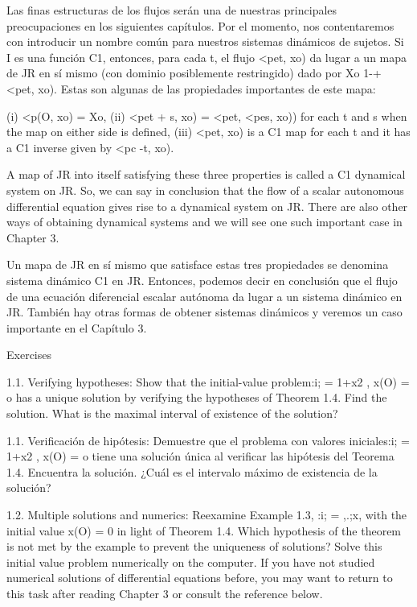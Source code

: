 \documentclass[]{article}
\begin{document}
Las finas estructuras de los flujos serán una de nuestras principales preocupaciones en los siguientes capítulos. Por el momento, nos contentaremos con introducir un nombre común para nuestros sistemas dinámicos de sujetos. Si I es una función C1, entonces, para cada t, el flujo <pet, xo) da lugar a un mapa de JR en sí mismo (con dominio posiblemente restringido) dado por Xo 1-+ <pet, xo). Estas son algunas de las propiedades importantes de este mapa:

(i) <p(O, xo) = Xo,
(ii) <pet + s, xo) = <pet, <pes, xo)) for each t and s when the map on either side is defined,
(iii) <pet, xo) is a C1 map for each t and it has a C1 inverse given by <pc -t, xo).

A map of JR into itself satisfying these three properties is called a C1 dynamical system on JR. So, we can say in conclusion that the flow of a scalar autonomous differential equation gives rise to a dynamical system on JR. There are also other ways of obtaining dynamical systems and we will see one such important case in Chapter 3.

Un mapa de JR en sí mismo que satisface estas tres propiedades se denomina sistema dinámico C1 en JR. Entonces, podemos decir en conclusión que el flujo de una ecuación diferencial escalar autónoma da lugar a un sistema dinámico en JR. También hay otras formas de obtener sistemas dinámicos y veremos un caso importante en el Capítulo 3.

Exercises

1.1. Verifying hypotheses: Show that the initial-value problem:i; = 1+x2 , x(O) = o has a unique solution by verifying the hypotheses of Theorem 1.4. Find the solution. What is the maximal interval of existence of the solution?

1.1. Verificación de hipótesis: Demuestre que el problema con valores iniciales:i; = 1+x2 , x(O) = o tiene una solución única al verificar las hipótesis del Teorema 1.4. Encuentra la solución. ¿Cuál es el intervalo máximo de existencia de la solución?

1.2. Multiple solutions and numerics: Reexamine Example 1.3, :i; = ,.;x, with the initial value x(O) = 0 in light of Theorem 1.4. Which hypothesis of the theorem is not met by the example to prevent the uniqueness of solutions? Solve this initial value problem numerically on the computer. If you have not studied numerical solutions of differential equations before, you may want to return to this task after reading Chapter 3 or consult the reference below. 
\end{document}
